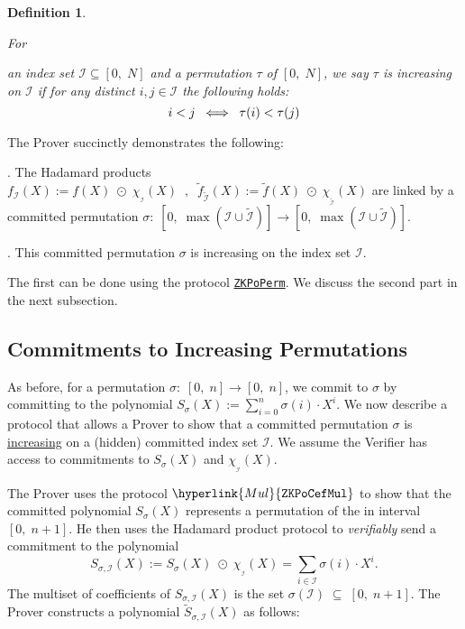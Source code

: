 \documentclass[11pt, lettersize, notitlepage, leqno, footskip=0.6cm]{article}
\newcommand{\lra}{\longrightarrow}
\newcommand{\LRA}{\Longleftrightarrow}
\newcommand{\wti}{\widetilde}
\newcommand{\mc}{\mathcal}
\newcommand{\sub}{\subseteq}
\newcommand{\vs}{\vspace{-0.15cm}}
\newcommand{\noin}{\noindent}
\newtheorem{Def}{Definition}[section]
\numberwithin{equation}{section}
\begin{document}
\begin{Def} \hypertarget{IncPermDef}{For} an index set $\mc{I}\sub [0,\;N]$ and a permutation $\tau$ of $[0,\;N]$, we say $\tau$ is increasing on $\mc{I}$ if for any distinct $i,j\in \mc{I}$ the following holds: \vs $$ i<j \;\;\LRA\;\; \tau(i) < \tau(j) \vs $$ \end{Def}

The Prover succinctly demonstrates the following: \vspace{2mm}

\noin 1. The Hadamard products $ f_{\mc{I}}(X) := f(X)\;\odot\; \chi_{_{\mc{I}}}(X)\;\;,\;\; \wti{f}_{\wti{\mc{I}}}(X) := \wti{f}(X)\;\odot\; \chi_{_{\wti{\mc{I}}}}(X) $ are linked by a committed permutation $\sigma:\;[0,\; \max(\mc{I}\cup \wti{\mc{I}})]\lra [0,\; \max(\mc{I}\cup \wti{\mc{I}})]$. \vspace{1mm}

\noin 2. This committed permutation $\sigma$ is increasing on the index set $\mc{I}$. \vspace{2mm}

The first can be done using the protocol \hyperlink{Perm}{\tt{ZKPoPerm}}. We discuss the second part in the next subsection.


\subsection{\fontsize{11}{11}\selectfont Commitments to Increasing Permutations}

As before, for a permutation $\sigma:\;[0,\; n]\lra [0,\; n]$, we commit to $\sigma$ by committing to the polynomial $S_{\sigma}(X):= \sum_{i=0}^n \sigma(i)\cdot X^i .$ We now describe a \hypertarget{Perm^}{protocol} that allows a Prover to show that a committed permutation $\sigma$ is \hyperlink{IncPerm}{increasing} on a (hidden) committed index set $\mc{I}$. We assume the Verifier has access to commitments to $S_{\sigma}(X)$ and $\chi_{_{\mc{I}}}(X)$. 

The Prover uses the protocol $\hyperlink{Mul}{\tt{ZKPoCefMul}}$ to show that the committed polynomial $S_{\sigma}(X)$ represents a permutation of the in interval $[0,\;n+1]$. He then uses the Hadamard product protocol to \textit{verifiably} send a commitment to the polynomial \vs $$ S_{\sigma,\mc{I}}(X):= S_{\sigma}(X)\;\odot\; \chi_{_{\mc{I}}}(X) = \sum\limits_{i\in\mc{I}} \sigma(i)\cdot X^i. $$ The multiset of coefficients of $S_{\sigma,\mc{I}}(X)$ is the set $\sigma(\mc{I})\;\sub\; [0,\;n+1]$. The Prover constructs a polynomial $\wti{S}_{\sigma,\mc{I}}(X)$ as follows: \vspace{2mm}
\end{document}
